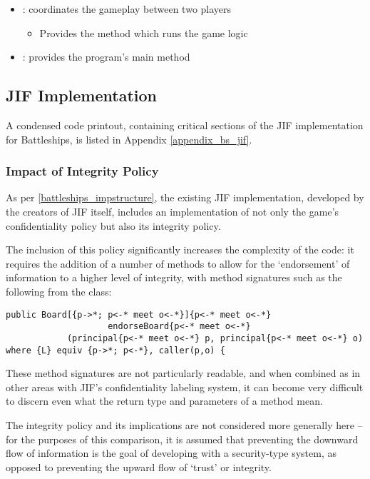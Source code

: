 \begin{itemize}
	\item {}: coordinates the gameplay between two players
	
	\begin{itemize}
		\item Provides the method which runs the game logic
	\end{itemize}
	
	\item {}: provides the program's main method
\end{itemize}

\newpage

\subsection{JIF Implementation} \label{cs_battleships_jif_impl}

A condensed code printout, containing critical sections of the JIF implementation for Battleships, is listed in Appendix \ref{appendix_bs_jif}.

\subsubsection{Impact of Integrity Policy}

As per \ref{battleships_impstructure}, the existing JIF implementation, developed by the creators of JIF itself, includes an implementation of not only the game's confidentiality policy but also its integrity policy.

The inclusion of this policy significantly increases the complexity of the code: it requires the addition of a number of methods to allow for the `endorsement' of information to a higher level of integrity, with method signatures such as the following from the  class:

\begin{verbatim}
public Board[{p->*; p<-* meet o<-*}]{p<-* meet o<-*} 
					endorseBoard{p<-* meet o<-*}
			(principal{p<-* meet o<-*} p, principal{p<-* meet o<-*} o)
where {L} equiv {p->*; p<-*}, caller(p,o) {
\end{verbatim}

These method signatures are not particularly readable, and when combined as in other areas with JIF's confidentiality labeling system, it can become very difficult to discern even what the return type and parameters of a method mean.

The integrity policy and its implications are not considered more generally here -- for the purposes of this comparison, it is assumed that preventing the downward flow of information is the goal of developing with a security-type system, as opposed to preventing the upward flow of `trust' or integrity.

